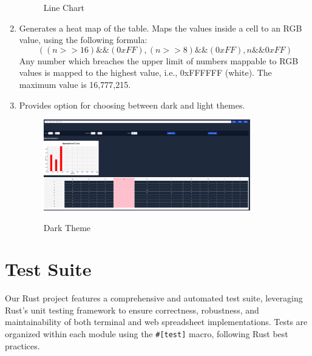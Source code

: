 \documentclass{article}
\begin{document}
\begin{enumerate}
\begin{figure}[t]
    \caption{Line Chart}
    \end{figure}
    \item Generates a heat map of the table. Maps the values inside a cell to an RGB value, using the following formula:
    $$((n>>16) \&\& (0xFF), (n>>8) \&\& (0xFF), n \&\& 0xFF)$$
    Any number which breaches the upper limit of numbers mappable to RGB values is mapped to the highest value, i.e., 0xFFFFFF (white). The maximum value is 16,777,215.
    \item Provides option for choosing between dark and light themes.
    \begin{figure}[t]
    \centering
    {{\includegraphics[width=9cm]{theme.jpg}}}
    \caption{Dark Theme}
    \end{figure}
\end{enumerate}

\section{Test Suite}

Our Rust project features a comprehensive and automated test suite, leveraging Rust's unit testing framework to ensure correctness, robustness, and maintainability of both terminal and web spreadsheet implementations. Tests are organized within each module using the \texttt{\#[test]} macro, following Rust best practices.
\end{document}
